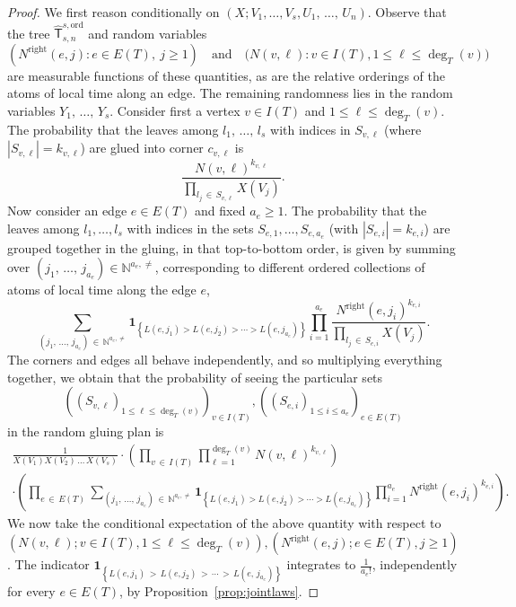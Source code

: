\documentclass[10pt]{amsart}
\theoremstyle{definition}\newtheorem{defi}[theo]{Definition}\newtheorem{rema}[theo]{Remark}\newtheorem{exam}[theo]{Example}\newtheorem{exem}[theo]{Example}\newtheorem{nota}[theo]{Notation}
\newcommand{\ind}[1]{\mathbf{1}_{\left\lbrace #1 \right\rbrace}}
\newcommand{\ord}{\mathrm{ord}}
\newcommand{\Rightll}{\mathrm{right}}
\newcommand{\sT}{\mathsf{T}}
\newcommand{\N}{\mathbb{N}}
\begin{document}
\begin{proof}
We first reason conditionally on $(X; V_1, \ldots, V_s, U_1,\,\ldots,\, U_n)$. Observe that the tree $\widehat{\sT}_{s,n}^{s,\ord}$ and random variables 
\[
\left(N^{\Rightll}(e,j) : e\in E(T), \ j\geq 1\right)\quad\text{and}\quad\big(N(v,\ell) : v\in I(T), 1\leq \ell \leq \deg_T(v)\big)
\]
are measurable functions of these quantities, as are the relative orderings of the atoms of local time along an edge. The remaining randomness lies in the random variables $Y_1,\,\ldots,\, Y_s$. Consider first a vertex $v \in I(T)$ and $1 \le \ell \le \deg_T(v)$. The probability that the leaves among $l_1,\,\ldots,\,l_s$ with indices in $S_{v,\ell}$ (where $|S_{v,\ell}| = k_{v,\ell}$) are glued into corner $c_{v,\ell}$ is
\[
\frac{N(v,\ell)^{k_{v,\ell}}}{\prod\limits_{l_j\,\in\,S_{v,\ell}} X(V_j)}.
\]
Now consider an edge $e \in E(T)$ and fixed $a_e \ge 1$. The probability that the leaves among $l_1, \ldots, l_s$ with indices in the sets $S_{e, 1}, \ldots, S_{e,a_e}$ (with $|S_{e,i}| = k_{e,i}$) are grouped together in the gluing, in that top-to-bottom order, is given by summing over $(j_1,\,\ldots, \,j_{a_e}) \in \N^{a_e, \neq}$, corresponding to different ordered collections of atoms of local time along the edge $e$,
\[
\sum_{\left(j_1,\,\ldots,\,j_{a_e}\right)\,\in\, \N^{a_e, \neq}} \ind{L\left(e,j_1\right) > L\left(e, j_2\right) > \cdots > L\left(e, j_{a_e}\right)} \prod_{i=1}^{a_e} \frac{N^{\Rightll}\left(e, j_i\right)^{k_{e, i}}} {\prod\limits_{l_j\,\in\,S_{e,i}} X\left(V_{j}\right)}.
\]
The corners and edges all behave independently, and so multiplying everything together, we obtain that the probability of seeing the particular sets 
\[
((S_{v,\ell})_{1 \le \ell \le \deg_T(v)})_{v \in I(T)}, ((S_{e,i})_{1 \le i \le a_e})_{e \in E(T)} 
\]
in the random gluing plan is
\begin{multline}\label{eq:proba choice atoms}
\frac{1}{X(V_1)X(V_2)\,\dots\,X(V_s)} \cdot \left(\prod_{v\,\in\,I(T)} \prod_{\ell=1}^{\deg_T(v)}N(v,\ell)^{k_{v,\ell}}\right)\\
\cdot \left(\prod_{e\,\in\,E(T)} \sum\limits_{\left(j_1,\,\ldots,\,j_{a_e}\right)\,\in\,\N^{a_e, \neq}}\ind{L\left(e,j_1\right) > L\left(e, j_2\right) > \cdots > L\left(e, j_{a_e}\right)}\prod_{i = 1}^{a_e}N^{\Rightll}\left(e,j_i\right)^{k_{e,i}}\right).
\end{multline}
We now take the conditional expectation of the above quantity with respect to $(N(v,\ell); v\in I(T), 1\leq \ell \leq \deg_T(v)), (N^{\Rightll}(e,j); e\in E(T), j\geq 1)$. The indicator $\ind{L(e,j_1)\,>\,L(e, j_2)\,>\,\cdots\,>\,L(e,\,j_{a_e})}$ integrates to $\frac{1}{a_e!}$, independently for every $e\in E(T)$, by Proposition~\ref{prop:jointlaws}.


\end{proof}
\end{document}
